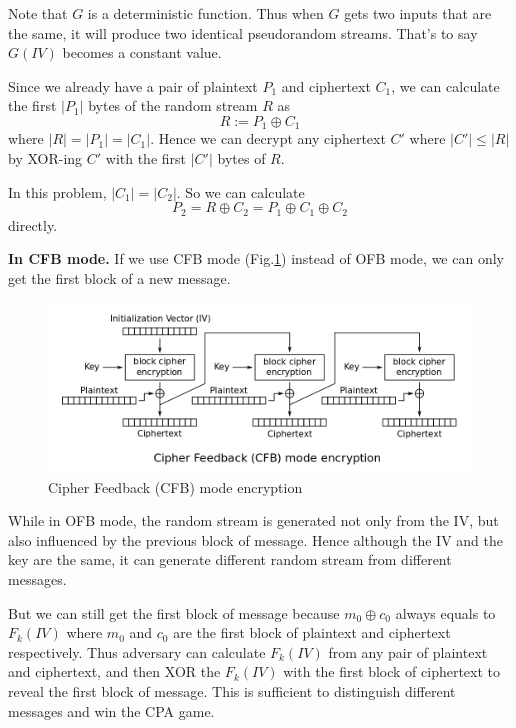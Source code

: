 Note that $G$ is a deterministic function. Thus when $G$ gets two inputs that are the same, it will produce two identical pseudorandom streams. That's to say $G(IV)$ becomes a constant value.

Since we already have a pair of plaintext $P_1$ and ciphertext $C_1$, we can calculate the first $|P_1|$ bytes of the random stream $R$ as $$
    R := P_1 \oplus C_1
$$ where $|R| = |P_1| = |C_1|$. Hence we can decrypt any ciphertext $C'$ where $|C'| \leq |R|$ by XOR-ing $C'$ with the first $|C'|$ bytes of $R$.

In this problem, $|C_1| = |C_2|$. So we can calculate $$
    P_2 = R \oplus C_2 = P_1 \oplus C_1 \oplus C_2
$$ directly.

\textbf{In CFB mode.}
If we use CFB mode (Fig.\ref{fig:CFB_encryption}) instead of OFB mode, we can only get the first block of a new message.

\begin{figure}[ht]
\centering
\includegraphics[width=\columnwidth]{pictures/CFB_encryption.png}
\caption{
    Cipher Feedback (CFB) mode encryption
}
\label{fig:CFB_encryption}
\end{figure}

While in OFB mode, the random stream is generated not only from the IV, but also influenced by the previous block of message. 
Hence although the IV and the key are the same, it can generate different random stream from different messages.

But we can still get the first block of message because $m_0 \oplus c_0$ always equals to $F_k(IV)$ where $m_0$ and $c_0$ are the first block of plaintext and ciphertext respectively. 
Thus adversary can calculate $F_k(IV)$ from any pair of plaintext and ciphertext, and then XOR the $F_k(IV)$ with the first block of ciphertext to reveal the first block of message.
This is sufficient to distinguish different messages and win the CPA game.

\subsubsection{}

